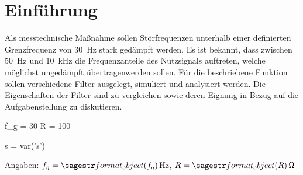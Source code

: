 \documentclass[a4paper]{hitec}
\author{Rene Hampölz}
\date{2022}
\begin{document}
\maketitletoc
\clearpage

\section{Einführung}

Als messtechnische Maßnahme sollen Störfrequenzen unterhalb einer definierten Grenzfrequenz von \qty{30}{\hertz} stark gedämpft werden. Es ist bekannt, dass zwischen \qty{50}{\hertz} und \qty{10}{\kilo\hertz} die Frequenzanteile des Nutzsignals auftreten, welche möglichst ungedämpft übertragenwerden sollen. Für die beschriebene Funktion sollen verschiedene Filter ausgelegt, simuliert und analysiert werden. Die Eigenschaften der Filter sind zu vergleichen sowie deren Eignung in Bezug auf die Aufgabenstellung zu diskutieren.

\begin{sagesilent}
    f_g = 30
    R = 100

    s = var('s')
\end{sagesilent}

Angaben: $f_{g} = \SIvar{f_g}{\hertz}$, $R = \SIvar{R}{\ohm}$






\vfill

\IncludeHistoryTimeline
\end{document}
